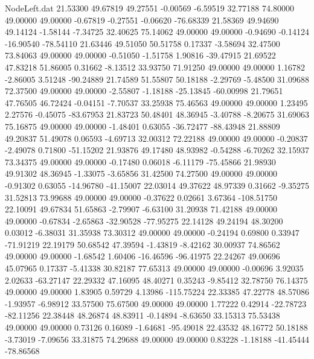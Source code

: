 \begin{filecontents}{NodeLeft.dat}
  21.53300   49.67819   49.27551    -0.00569   -6.59519   32.77188   74.80000   49.00000   49.00000   -0.67819   -0.27551   -0.06620  -76.68339
  21.58369   49.94690   49.14124    -1.58144   -7.34725   32.40625   75.14062   49.00000   49.00000   -0.94690   -0.14124  -16.90540  -78.54110
  21.63446   49.51050   50.51758     0.17337   -3.58694   32.47500   73.84063   49.00000   49.00000   -0.51050   -1.51758    1.90816  -39.47915
  21.69522   47.83218   51.86005     0.31662   -8.13512   33.93750   71.91250   49.00000   49.00000    1.16782   -2.86005    3.51248  -90.24889
  21.74589   51.55807   50.18188    -2.29769   -5.48500   31.09688   72.37500   49.00000   49.00000   -2.55807   -1.18188  -25.13845  -60.00998
  21.79651   47.76505   46.72424    -0.04151   -7.70537   33.25938   75.46563   49.00000   49.00000    1.23495    2.27576   -0.45075  -83.67953
  21.83723   50.48401   48.36945    -3.40788   -8.20675   31.69063   75.16875   49.00000   49.00000   -1.48401    0.63055  -36.72477  -88.43948
  21.88809   49.20837   51.49078     0.06593   -4.69713   32.00312   72.22188   49.00000   49.00000   -0.20837   -2.49078    0.71800  -51.15202
  21.93876   49.17480   48.93982    -0.54288   -6.70262   32.15937   73.34375   49.00000   49.00000   -0.17480    0.06018   -6.11179  -75.45866
  21.98930   49.91302   48.36945    -1.33075   -3.65856   31.42500   74.27500   49.00000   49.00000   -0.91302    0.63055  -14.96780  -41.15007
  22.03014   49.37622   48.97339     0.31662   -9.35275   31.52813   73.99688   49.00000   49.00000   -0.37622    0.02661    3.67364 -108.51750
  22.10091   49.67834   51.65863    -2.79907   -6.63100   31.20938   71.42188   49.00000   49.00000   -0.67834   -2.65863  -32.90528  -77.95275
  22.14128   49.24194   48.30200     0.03012   -6.38031   31.35938   73.30312   49.00000   49.00000   -0.24194    0.69800    0.33947  -71.91219
  22.19179   50.68542   47.39594    -1.43819   -8.42162   30.00937   74.86562   49.00000   49.00000   -1.68542    1.60406  -16.46596  -96.41975
  22.24267   49.00696   45.07965     0.17337   -5.41338   30.82187   77.65313   49.00000   49.00000   -0.00696    3.92035    2.02633  -63.27147
  22.29332   47.16095   48.40271     0.35243   -9.85412   32.78750   76.14375   49.00000   49.00000    1.83905    0.59729    4.13986 -115.75224
  22.33385   47.22778   48.57086    -1.93957   -6.98912   33.57500   75.67500   49.00000   49.00000    1.77222    0.42914  -22.78723  -82.11256
  22.38448   48.26874   48.83911    -0.14894   -8.63650   33.15313   75.53438   49.00000   49.00000    0.73126    0.16089   -1.64681  -95.49018
  22.43532   48.16772   50.18188    -3.73019   -7.09656   33.31875   74.29688   49.00000   49.00000    0.83228   -1.18188  -41.45444  -78.86568

\end{filecontents}
